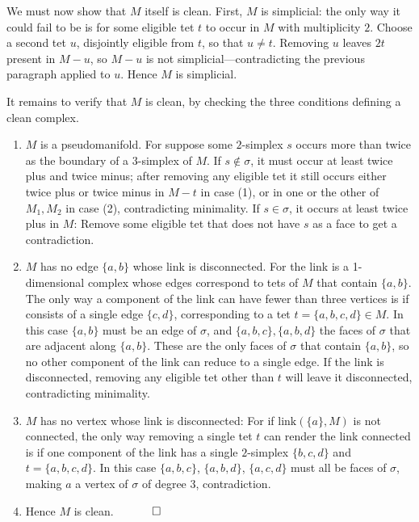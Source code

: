 \documentclass[12pt]{article}
\newcommand{\proofend}{$\quad \qed$}
\newcommand{\kw}{\mathrm}
\newcommand{\link}{\kw{link}}
\begin{document}
We must now show that $M$ itself is clean. First, $M$ is simplicial: the
only way it could fail to be is for some eligible tet $t$ to occur in $M$
with multiplicity $2$. Choose a second tet $u$, disjointly eligible from
$t$, so that $u\neq t$. Removing $u$ leaves $2t$ present in $M-u$, so
$M-u$ is not simplicial---contradicting the previous paragraph applied to
$u$. Hence $M$ is simplicial.

It remains to verify that $M$ is clean, by checking the three conditions
defining a clean complex.

\begin{enumerate}

\item
$M$ is a pseudomanifold.
For suppose some $2$-simplex $s$ occurs more than twice as the boundary
of a $3$-simplex of $M$.
If $s \notin \sigma$,
it must occur at least twice plus and twice minus;
after removing any eligible tet it
still occurs either twice plus or twice minus in $M-t$ in case (1),
or in one or the other of $M_1,M_2$ in case (2),
contradicting minimality.
If $s \in \sigma$,
it occurs at least twice plus in $M$:
Remove some eligible tet that does not have $s$ as a face
to get a contradiction.

\item
$M$ has no edge $\{a,b\}$ whose link
is disconnected.
For the link is a 1-dimensional complex whose edges correspond to
tets of $M$ that contain $\{a,b\}$.
The only way a component of the link can have fewer than three
vertices is if consists of a single edge $\{c,d\}$, corresponding
to a tet $t=\{a,b,c,d\} \in M$.
In this case $\{a,b\}$ must be an edge of $\sigma$,
and $\{a,b,c\},\{a,b,d\}$ the faces of $\sigma$
that are adjacent along $\{a,b\}$.
These are the only faces of $\sigma$ that contain $\{a,b\}$,
so no other component of the link can reduce to a single edge.
If the link is disconnected, removing any eligible tet
other than $t$ will
leave it disconnected, contradicting minimality.

\item
$M$ has no vertex whose link is disconnected:
For if $\link(\{a\},M)$ is not connected,
the only way removing a single tet $t$
can render the link connected
is if one component of the link has a single $2$-simplex
$\{b,c,d\}$ and $t=\{a,b,c,d\}$.
In this case $\{a,b,c\}$, $\{a,b,d\}$, $\{a,c,d\}$ must
all be faces of $\sigma$,
making $a$ a vertex of $\sigma$ of degree $3$, contradiction.

\item Hence $M$ is clean.
\proofend

\end{enumerate}
\end{document}
